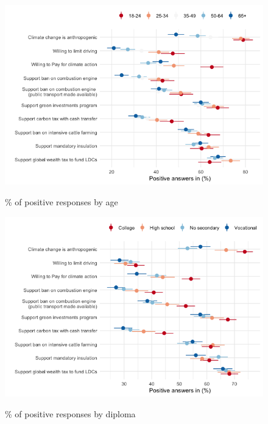 \begin{framefont}{\small}
\begin{frame}{}%
\begin{figure}[h!]
\caption{\% of positive responses by age}
\includegraphics[width=.7\paperwidth]{../figures/FR/positive_all_by_age_FR.png} \\
\end{figure}
\end{frame}

\begin{frame}{}%
\begin{figure}[h!]
\caption{\% of positive responses by diploma}
\includegraphics[width=.7\paperwidth]{../figures/FR/positive_all_by_diploma_FR.png} \\
\end{figure}
\end{frame}


\end{framefont}
